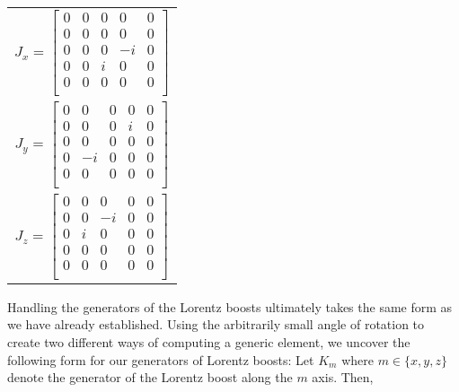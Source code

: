 \documentclass[10pt]{ucthesis}
\begin{document}
\begin{center}
\begin{tabular}{c}
	$J_x = \begin{bmatrix}
				0 & 0 & 0 & 0 & 0 \\
				0 & 0 & 0 & 0 & 0\\
				0 & 0 & 0 & -i & 0\\
				0 & 0 & i & 0 & 0\\
				0 & 0 & 0 & 0 & 0\\
			\end{bmatrix}$ \\
	$J_y = \begin{bmatrix}
				0 & 0 & 0 & 0 & 0 \\
				0 & 0 & 0 & i & 0\\
				0 & 0 & 0 & 0 & 0\\
				0 & -i & 0 & 0 & 0\\
				0 & 0 & 0 & 0 & 0\\
			\end{bmatrix}$ \\
	$J_z = \begin{bmatrix}
				0 & 0 & 0 & 0 & 0 \\
				0 & 0 & -i & 0 & 0\\
				0 & i & 0 & 0 & 0\\
				0 & 0 & 0 & 0 & 0\\
				0 & 0 & 0 & 0 & 0\\
			\end{bmatrix}$ 
\end{tabular}
\end{center}

Handling the generators of the Lorentz boosts ultimately takes the same form as we have already established. Using the arbitrarily small angle of rotation to create two different ways of computing a generic element, we uncover the following form for our generators of Lorentz boosts: Let $K_m$ where $m\in\{x,y,z\}$ denote the generator of the Lorentz boost along the $m$ axis. Then,
\end{document}

